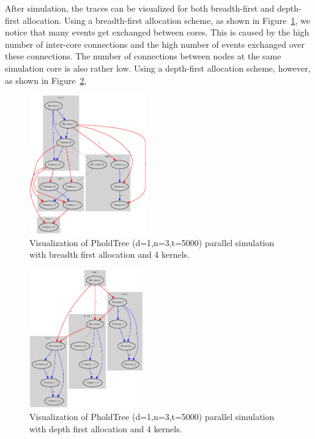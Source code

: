 After simulation, the traces can be visualized for both breadth-first and depth-first allocation.
Using a breadth-first allocation scheme, as shown in Figure~\ref{fig:pholdtree_visualize_parBFS}, we notice that many events get exchanged between cores.
This is caused by the high number of inter-core connections and the high number of events exchanged over these connections.
The number of connections between nodes at the same simulation core is also rather low.
Using a depth-first allocation scheme, however, as shown in Figure~\ref{fig:pholdtree_visualize_parDFS},

\begin{figure}
    \center
    \includegraphics[width=\plotfraction\columnwidth,  height=6cm, keepaspectratio]{fig/pholdtreed1n3t5000c4BFS.eps}
    \caption{Visualization of PholdTree (d=1,n=3,t=5000) parallel simulation with breadth first allocation and 4 kernels.}
    \label{fig:pholdtree_visualize_parBFS}
\end{figure}
\begin{figure}
    \center
    \includegraphics[width=\plotfraction\columnwidth,  height=6cm, keepaspectratio]{fig/pholdtreed1n3t5000c4DFS.eps}
    \caption{Visualization of PholdTree (d=1,n=3,t=5000) parallel simulation with depth first allocation and 4 kernels.}
    \label{fig:pholdtree_visualize_parDFS}
\end{figure}


